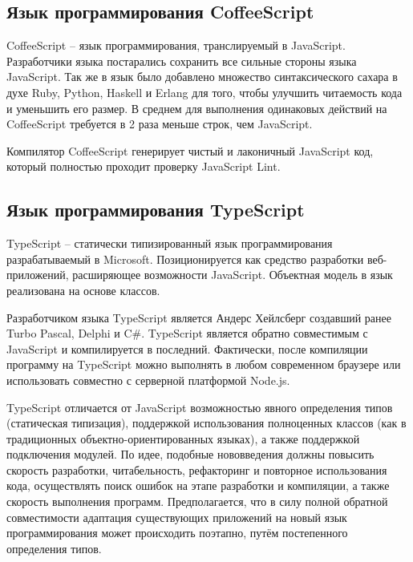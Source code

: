 \subsection{Язык программирования CoffeeScript}

CoffeeScript -- язык программирования, транслируемый в JavaScript. Разработчики языка постарались сохранить все сильные стороны языка JavaScript. Так же в язык было добавлено множество синтаксического сахара в духе Ruby, Python, Haskell и Erlang для того, чтобы улучшить читаемость кода и уменьшить его размер. В среднем для выполнения одинаковых действий на CoffeeScript требуется в 2 раза меньше строк, чем JavaScript.

Компилятор CoffeeScript генерирует чистый и лаконичный JavaScript код, который полностью проходит проверку JavaScript Lint.
\cite{CoffeeScript}

\subsection{Язык программирования TypeScript}

TypeScript -- статически типизированный язык программирования разрабатываемый в Microsoft. Позиционируется как средство разработки веб-приложений, расширяющее возможности JavaScript. Объектная модель в язык реализована на основе классов.

Разработчиком языка TypeScript является Андерс Хейлсберг создавший ранее Turbo Pascal, Delphi и C\#.
TypeScript является обратно совместимым с JavaScript и компилируется в последний. Фактически, после компиляции программу на TypeScript можно выполнять в любом современном браузере или использовать совместно с серверной платформой Node.js.

TypeScript отличается от JavaScript возможностью явного определения типов (статическая типизация), поддержкой использования полноценных классов (как в традиционных объектно-ориентированных языках), а также поддержкой подключения модулей. По идее, подобные нововведения должны повысить скорость разработки, читабельность, рефакторинг и повторное использования кода, осуществлять поиск ошибок на этапе разработки и компиляции, а также скорость выполнения программ.
Предполагается, что в силу полной обратной совместимости адаптация существующих приложений на новый язык программирования может происходить поэтапно, путём постепенного определения типов. \cite{wiki:TypeScript, TypeScript}

